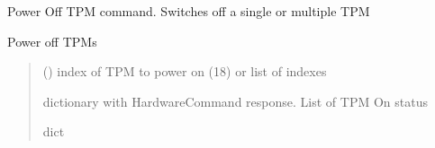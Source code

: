 \documentclass[letterpaper,10pt,english]{sphinxmanual}
\begin{document}
\begin{fulllineitems}
\label{\detokenize{webserverdocs:subrack_hardware.PowerOffTpmCommand}}
\pysigstartsignatures
{}
\pysigstopsignatures
\sphinxAtStartPar
Power Off TPM command. Switches off a single or multiple TPM

\begin{fulllineitems}
\label{\detokenize{webserverdocs:subrack_hardware.PowerOffTpmCommand.thread}}
\pysigstartsignatures
{}
\pysigstopsignatures
\sphinxAtStartPar
Power off TPMs
\begin{quote}\begin{description}
\sphinxAtStartPar
{} (\sphinxstyleliteralemphasis{\sphinxupquote{, }}\sphinxstyleliteralemphasis{\sphinxupquote{(}}\sphinxstyleliteralemphasis{\sphinxupquote{)}}) \textendash{} index of TPM to power on (1\sphinxhyphen{}8) or list of indexes

\sphinxAtStartPar
dictionary with HardwareCommand response. List of TPM On status

\sphinxAtStartPar
dict

\end{description}\end{quote}

\end{fulllineitems}


\end{fulllineitems}

\end{document}
